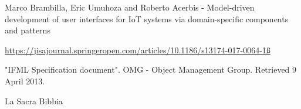 

\begin{thebibliography}{90}

Marco Brambilla, Eric Umuhoza and Roberto Acerbis - Model-driven development of user interfaces for IoT systems via domain-specific components and patterns

\url{https://jisajournal.springeropen.com/articles/10.1186/s13174-017-0064-1ß}
    
"IFML Specification document". OMG - Object Management Group. Retrieved 9 April 2013.


La Sacra Bibbia
\end{thebibliography}


